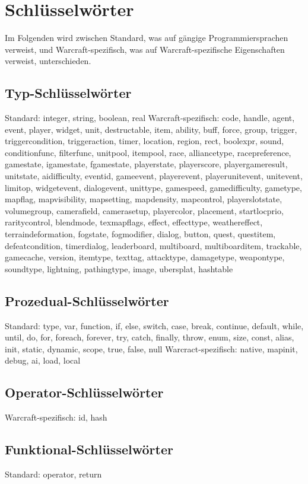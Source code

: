 \chapter{Schlüsselwörter}

Im Folgenden wird zwischen Standard, was auf gängige Programmiersprachen verweist, und Warcraft-spezifisch, was auf Warcraft-spezifische
Eigenschaften verweist, unterschieden.

\section{Typ-Schlüsselwörter}
Standard: integer, string, boolean, real
Warcraft-spezifisch: code, handle, agent, event, player, widget, unit, destructable, item, ability, buff, force, group, trigger, triggercondition, triggeraction, timer, location, region, rect, boolexpr, sound, conditionfunc, filterfunc, unitpool, itempool, race, alliancetype, racepreference, gamestate, igamestate, fgamestate, playerstate, playerscore, playergameresult, unitstate, aidifficulty, eventid, gameevent, playerevent, playerunitevent, unitevent, limitop, widgetevent, dialogevent, unittype, gamespeed, gamedifficulty, gametype, mapflag, mapvisibility, mapsetting, mapdensity, mapcontrol, playerslotstate, volumegroup, camerafield, camerasetup, playercolor, placement, startlocprio, raritycontrol, blendmode, texmapflags, effect, effecttype, weathereffect, terraindeformation, fogstate, fogmodifier, dialog, button, quest, questitem, defeatcondition, timerdialog, leaderboard, multiboard, multiboarditem, trackable, gamecache, version, itemtype, texttag, attacktype, damagetype, weapontype, soundtype, lightning, pathingtype, image, ubersplat, hashtable

\section{Prozedual-Schlüsselwörter}
Standard: type, var, function, if, else, switch, case, break, continue, default, while, until, do, for, foreach, forever, try, catch, finally, throw, enum, size, const, alias, init, static, dynamic, scope, true, false, null
Warcract-spezifisch: native, mapinit, debug, ai, load, local

\section{Operator-Schlüsselwörter}
Warcraft-spezifisch: id, hash

\section{Funktional-Schlüsselwörter}
Standard: operator, return

